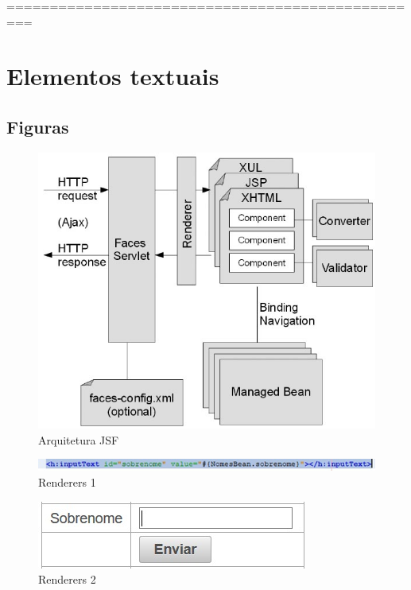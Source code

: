 \documentclass[	DIV=calc,%
							paper=a4,%
							fontsize=12pt,%
							onecolumn]{scrartcl}	 					%
\begin{document}
=================================================
\section{Elementos textuais}

\subsection{Figuras}


\begin{figure}
\centering
\includegraphics[width=\textwidth]{jsf_mvc}
\caption{Arquitetura JSF}
\label{fig1}
\end{figure}


\begin{figure}
\centering
\includegraphics[width=\textwidth]{render1}
\caption{Renderers 1}
\label{fig2}
\end{figure}


\begin{figure}
\centering
\includegraphics[width=\textwidth]{render2}
\caption{Renderers 2}
\label{fig3}
\end{figure}
\end{document}
